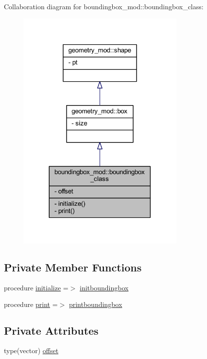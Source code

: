 Collaboration diagram for boundingbox\+\_\+mod\+:\+:boundingbox\+\_\+class\+:
\nopagebreak
\begin{figure}[H]
\begin{center}
\leavevmode
\includegraphics[width=236pt]{structboundingbox__mod_1_1boundingbox__class__coll__graph}
\end{center}
\end{figure}
\subsection*{Private Member Functions}
\begin{DoxyCompactItemize}
\item 
procedure \mbox{\hyperlink{structboundingbox__mod_1_1boundingbox__class_a21f88c3fc204dab330d98c85728994c1}{initialize}} =$>$ \mbox{\hyperlink{namespaceboundingbox__mod_a35e41bb92c19802441dd8d748c3acfb4}{initboundingbox}}
\item 
procedure \mbox{\hyperlink{structboundingbox__mod_1_1boundingbox__class_aac90c83bef1a3156893cc0cb5d5647e6}{print}} =$>$ \mbox{\hyperlink{namespaceboundingbox__mod_a6ec461b758bc180dc72b5fb23169feca}{printboundingbox}}
\end{DoxyCompactItemize}
\subsection*{Private Attributes}
\begin{DoxyCompactItemize}
\item 
type(vector) \mbox{\hyperlink{structboundingbox__mod_1_1boundingbox__class_a49a3cc9011829c2e1fbbbffa76580f63}{offset}}
\end{DoxyCompactItemize}


